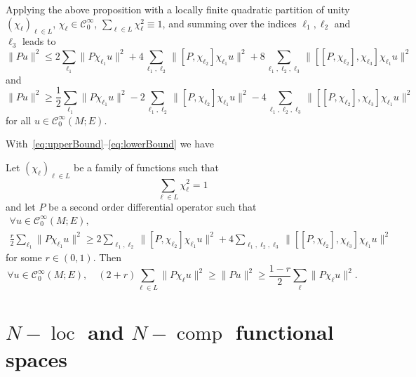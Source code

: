 \documentclass[10pt]{amsart}
\theoremstyle{definition}\newtheorem{defi}[theo]{Definition}\newtheorem{rema}[theo]{Remark}\newtheorem{exam}[theo]{Example}\newtheorem{exem}[theo]{Example}\newtheorem{nota}[theo]{Notation}
\newcommand{\clC}{\mathcal{C}}
\DeclareMathOperator{\ccomp}{comp}
\DeclareMathOperator{\locc}{loc}
\let\oldforall\forall
\renewcommand*{\forall}{\mathrel{\oldforall}}
\begin{document}
Applying the above proposition with a locally finite quadratic partition of unity $(\chi_{\ell})_{\ell\in L}$, $\chi_{\ell}\in \clC^{\infty}_{0}$, $\sum_{\ell\in L}\chi_{\ell}^{2}\equiv 1$, and summing over the indices $\ell_{1},\ell_{2}$ and $\ell_{3}$ leads to
\begin{equation}\label{eq:upperBound}
\|Pu\|^{2} \leq 2 \sum_{\ell_{1}}\|P\chi_{\ell_{1}} u \|^{2} + 4 \sum_{\ell_{1},\ell_{2}} \|[P,\chi_{\ell_{2}}]\chi_{\ell_{1}}u\|^{2} + 8 \sum_{\ell_{1},\ell_{2},\ell_{3}}\|[[P,\chi_{\ell_{2}}],\chi_{\ell_{3}}]\chi_{\ell_{1}}u \|^{2}
\end{equation}
and
\begin{equation}\label{eq:lowerBound}
\|Pu\|^{2} \geq \frac{1}{2} \sum_{\ell_{1}}\|P\chi_{\ell_{1}} u \|^{2} -2 \sum_{\ell_{1},\ell_{2}} \|[P,\chi_{\ell_{2}}]\chi_{\ell_{1}}u\|^{2} -4 \sum_{\ell_{1},\ell_{2},\ell_{3}}\|[[P,\chi_{\ell_{2}}],\chi_{\ell_{3}}]\chi_{\ell_{1}}u \|^{2}
\end{equation}
for all $u\in \clC^{\infty}_{0}(M;E)$.

With~\eqref{eq:upperBound}--\eqref{eq:lowerBound} we have

\begin{coro}\label{Cor:equivalenceOfQuantities}
Let $(\chi_{\ell})_{\ell\in L}$ be a family of functions such that
\[
\sum_{\ell\in L} \chi_{\ell}^{2} = 1
\]
and let $P$ be a second order differential operator such that
\begin{multline}\label{eq:equivH}
\forall u \in \clC^{\infty}_{0}(M;E), \\
\frac{r}{2}\sum_{\ell_{1}}\|P\chi_{\ell_{1}} u \|^{2}
\geq 2 \sum_{\ell_{1},\ell_{2}} \|[P,\chi_{\ell_{2}}]\chi_{\ell_{1}}u\|^{2} 
+4 \sum_{\ell_{1},\ell_{2},\ell_{3}}\|[[P,\chi_{\ell_{2}}],\chi_{\ell_{3}}]\chi_{\ell_{1}}u \|^{2}
\end{multline}
for some $r\in (0,1)$. Then
\begin{equation}\label{eq:equiv1}
\forall u\in \clC^{\infty}_{0}(M;E),\quad (2+r) \sum_{\ell\in L}\|P\chi_{\ell}u\|^{2}\geq \|Pu\|^{2}\geq \frac{1-r}{2} \sum_{\ell}\|P\chi_{\ell}u\|^{2}.
\end{equation}
\end{coro}


\section{\texorpdfstring{$N-\locc$}{N-loc} and \texorpdfstring{$N-\ccomp$}{N-comp} functional spaces}\label{sec:Qloccomp}
\end{document}
